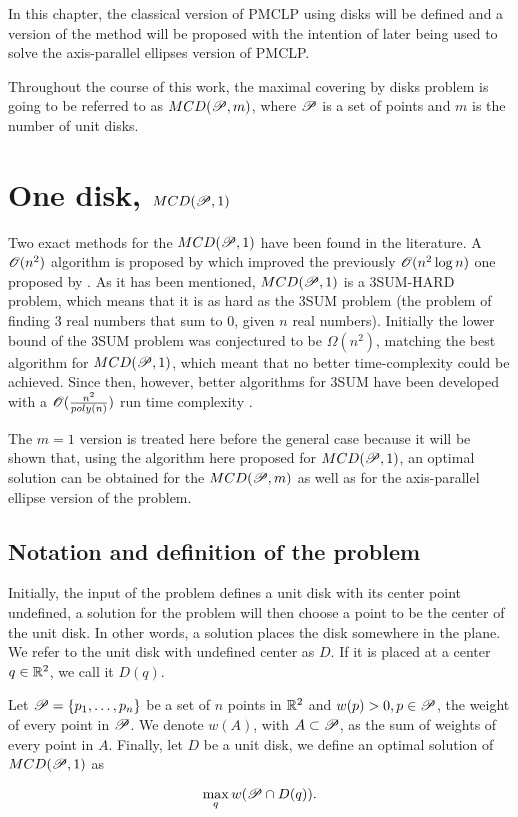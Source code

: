 In this chapter, the classical version of PMCLP using disks will be defined and a version of the method will be proposed with the intention of later being used to solve the axis-parallel ellipses version of PMCLP. 


Throughout the course of this work, the maximal covering by disks problem is going to be referred to as $MCD(\mathscr{P},m)$, where $\mathscr{P}$ is a set of points and $m$ is the number of unit disks.

\section{One disk, $MCD(\mathscr{P},1)$}


Two exact methods for the $MCD(\mathscr{P}, 1)$ have been found in the literature. A $\mathscr{O}(n^2)$ algorithm is proposed by \cite{chazelle:1986} which improved the previously $\mathscr{O}(n^2\log{n})$ one proposed by \cite{drezner}.
As it has been mentioned, $MCD(\mathscr{P},1)$ is a 3SUM-HARD problem, which means that it is as hard as the 3SUM problem (the problem of finding $3$ real numbers that sum to $0$, given $n$ real numbers). Initially the lower bound of the 3SUM problem was conjectured to be $\Omega(n^2)$, matching the best algorithm for $MCD(\mathscr{P},1)$, which meant that no better time-complexity could be achieved. Since then, however, better algorithms for 3SUM have been developed with a $\mathscr{O}(\frac{n^2}{poly(n)})$ run time complexity \cite{3SUM-kopelowitz:2014}.

The $m=1$ version is treated here before the general case because it will be shown that, using the algorithm here proposed for $MCD(\mathscr{P}, 1)$, an optimal solution can be obtained for the $MCD(\mathscr{P}, m)$ as well as for the axis-parallel ellipse version of the problem.

\subsection{Notation and definition of the problem}

Initially, the input of the problem defines a unit disk with its center point undefined, a solution for the problem will then choose a point to be the center of the unit disk. In other words, a solution places the disk somewhere in the plane.
We refer to the unit disk with undefined center as $D$. If it is placed at a center $q \in \mathbb{R}^2$, we call it $D(q)$.

\begin{definicao}
    Let $\mathscr{P}=\{p_1,\dots,p_n\}$ be a set of $n$ points in $\mathbb{R}^2$ and $w(p)>0, p \in \mathscr{P}$, the weight of every point in $\mathscr{P}$. We denote $w(A)$, with $A \subset \mathscr{P}$, as the sum of weights of every point in $A$. Finally, let $D$ be a unit disk, we define an optimal solution of $MCD(\mathscr{P},1)$ as
    
    \begin{equation}\label{eq:max_one_disk}
        \max_q w(\mathscr{P} \cap D(q)).
    \end{equation}

\end{definicao}

